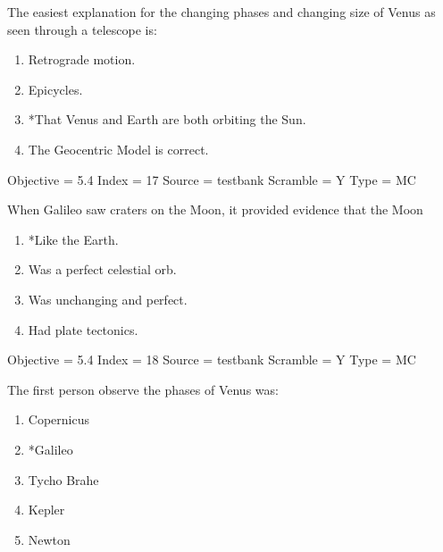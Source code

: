 \documentclass[11pt]{article}
\begin{document}
\begin{enumerate}
\begin{minipage}{\textwidth}
\begin{minipage}{\textwidth}
\item The easiest explanation for the changing phases and changing size of Venus as seen through a telescope is:
\begin{enumerate} 
\setlength{\itemsep}{1pt} 
\setlength{\parskip}{0pt} 
\setlength{\parsep}{0pt}
\setlength{\multicolsep}{1pt} 
\item Retrograde motion.
\item Epicycles.
\item *That Venus and Earth are both orbiting the Sun.
\item The Geocentric Model is correct.
\end{enumerate} 
Objective = 5.4
Index = 17
Source = testbank
Scramble = Y
Type = MC
\end{minipage}
\end{minipage}
\vskip 0.20in

\begin{minipage}{\textwidth}
\begin{minipage}{\textwidth}
\item When Galileo saw craters on the Moon, it provided evidence that the Moon
\begin{multicols}{2}
\begin{enumerate} 
\setlength{\itemsep}{1pt} 
\setlength{\parskip}{0pt} 
\setlength{\parsep}{0pt}
\setlength{\multicolsep}{1pt} 
\item *Like the Earth.
\item Was a perfect celestial orb.
\item Was unchanging and perfect.
\item Had plate tectonics.
\end{enumerate} 
\vfill 
\end{multicols}

Objective = 5.4
Index = 18
Source = testbank
Scramble = Y
Type = MC
\end{minipage}
\end{minipage}
\vskip 0.20in

\begin{minipage}{\textwidth}
\begin{minipage}{\textwidth}
\item The first person observe the phases of Venus was:
\begin{multicols}{3}
\begin{enumerate} 
\setlength{\itemsep}{1pt} 
\setlength{\parskip}{0pt} 
\setlength{\parsep}{0pt}
\setlength{\multicolsep}{1pt} 
\item Copernicus
\item *Galileo
\item Tycho Brahe
\item Kepler
\item Newton
\end{enumerate} 
\vfill 
\end{multicols}


\end{minipage}
\end{minipage}
\end{enumerate}
\end{document}
